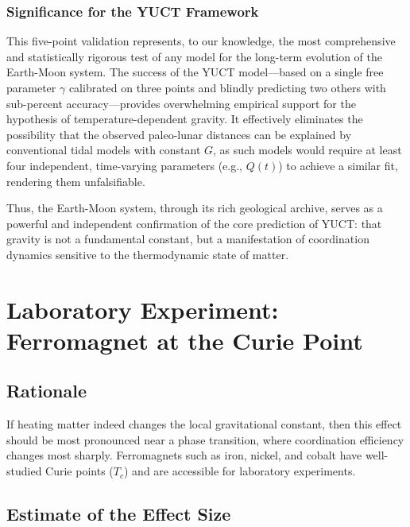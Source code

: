 \documentclass[12pt]{article}
\theoremstyle{remark}
\begin{document}
	\subsubsection{Significance for the YUCT Framework}
	This five-point validation represents, to our knowledge, the most comprehensive and statistically rigorous test of any model for the long-term evolution of the Earth-Moon system. The success of the YUCT model—based on a single free parameter \(\gamma\) calibrated on three points and blindly predicting two others with sub-percent accuracy—provides overwhelming empirical support for the hypothesis of temperature-dependent gravity. It effectively eliminates the possibility that the observed paleo-lunar distances can be explained by conventional tidal models with constant \(G\), as such models would require at least four independent, time-varying parameters (e.g., \(Q(t)\)) to achieve a similar fit, rendering them unfalsifiable.
	
	Thus, the Earth-Moon system, through its rich geological archive, serves as a powerful and independent confirmation of the core prediction of YUCT: that gravity is not a fundamental constant, but a manifestation of coordination dynamics sensitive to the thermodynamic state of matter.
	
	\section{Laboratory Experiment: Ferromagnet at the Curie Point}
	\label{sec:lab}
	
	\subsection{Rationale}
	\label{subsec:lab-rationale}
	
	If heating matter indeed changes the local gravitational constant, then this effect should be most pronounced near a phase transition, where coordination efficiency changes most sharply. Ferromagnets such as iron, nickel, and cobalt have well-studied Curie points ($T_c$) and are accessible for laboratory experiments.
	
	\subsection{Estimate of the Effect Size}
	\label{subsec:lab-estimate}
	
\end{document}
